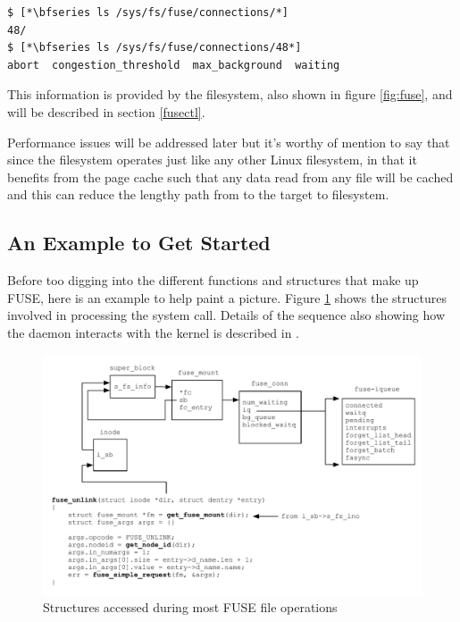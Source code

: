 \begin{lstlisting}
$ [*\bfseries ls /sys/fs/fuse/connections/*]
48/
$ [*\bfseries ls /sys/fs/fuse/connections/48*]
abort  congestion_threshold  max_background  waiting
\end{lstlisting}

\noindent
This information is provided by the  filesystem, also shown in figure \ref{fig:fuse}, and will be described in section \ref{fusectl}.

Performance issues will be addressed later but it's worthy of mention to say that since the  filesystem operates just like any other Linux filesystem, in that it benefits from the page cache such that any data read from any file will be cached and this can reduce the lengthy path from to the target to filesystem.


\subsection{An Example to Get Started}

Before too digging into the different functions and structures that make up FUSE, here is an example to help paint a picture. Figure \ref{fig:fuse-structs} shows the structures involved in processing the  system call. Details of the sequence also showing how the  daemon interacts with the kernel is described in \label{general-flow}.

\begin{figure}[h]
	\includegraphics[scale=0.6]{figures/fuse-structs.pdf}
	\centering
	\caption{Structures accessed during most FUSE file operations}
	\label{fig:fuse-structs}
\end{figure}

